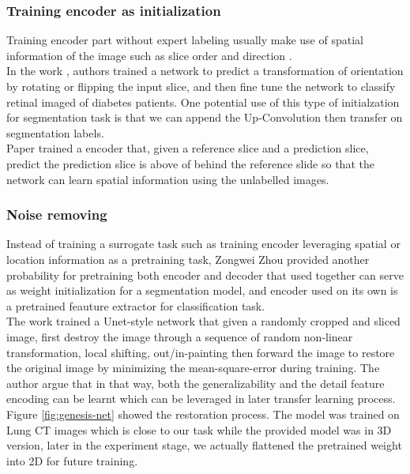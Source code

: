 \subsubsection{Training encoder as initialization}
Training encoder part without expert labeling usually make use of spatial information of the image such as slice order \cite{10.1007/978-3-319-66179-7_47} and direction \cite{8759553}. \\

In the work \cite{8759553}, authors trained a network to predict a transformation of orientation by rotating or flipping the input slice, and then fine tune the network to classify retinal imaged of diabetes patients. One potential use of this type of initialzation for segmentation task is that we can append the Up-Convolution then transfer on segmentation labels.\\

Paper \cite{10.1007/978-3-319-66179-7_47} trained a encoder that, given a reference slice and a prediction slice, predict the prediction slice is above of behind the reference slide so that the network can learn spatial information using the unlabelled images.\\

\subsubsection{Noise removing}
Instead of training a surrogate task such as training encoder leveraging spatial or location information as a pretraining task, Zongwei Zhou \cite{zhou_models_2019} provided another probability for pretraining both encoder and decoder that used together can serve as weight initialization for a segmentation model, and encoder used on its own is a pretrained feauture extractor for classification task.\\

The work trained a Unet-style network that given a randomly cropped and sliced image, first destroy the image through a sequence of random non-linear transformation, local shifting, out/in-painting then forward the image to restore the original image by minimizing the mean-square-error during training. The author argue that in that way, both the generalizability and the detail feature encoding can be learnt which can be leveraged in later transfer learning process. Figure \ref{fig:genesis-net} showed the restoration process. The model was trained on Lung CT images which is close to our task while the provided model was in 3D version, later in the experiment stage, we actually flattened the pretrained weight into 2D for future training.

